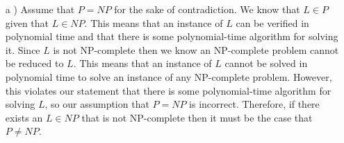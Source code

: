 
\begin{solution}

\begin{itemize}
	\item [a]) Assume that $P=NP$ for the sake of contradiction. We know that $L\in P$ given that $L\in NP$. This means that an instance of $L$ can be verified in polynomial time and that there is some polynomial-time algorithm for solving it. Since $L$ is not NP-complete then we know an NP-complete problem cannot be reduced to $L$. This means that an instance of $L$ cannot be solved in polynomial time to solve an instance of any NP-complete problem. However, this violates our statement that there is some polynomial-time algorithm for solving $L$, so our assumption that $P=NP$ is incorrect. Therefore, if there exists an $L\in NP$ that is not NP-complete then it must be the case that $P\ne NP$.
\end{itemize}

\end{solution}
